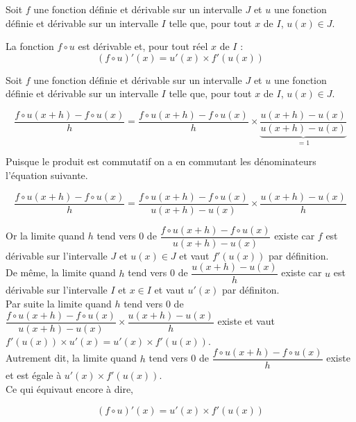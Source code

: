 \documentclass[french]{book}
\begin{document}
\begin{prop}
% 
% 
% 
Soit $f$ une fonction définie et dérivable sur un intervalle $J$ et $u$ une fonction définie et dérivable sur un intervalle $I$ telle que, pour tout $x$ de $I$, $u(x)\in J$.

La fonction $f \circ u$ est dérivable et, pour tout réel $x$ de $I$ : \[(f\circ u)'(x)=u'(x)\times f'(u(x))\]
\end{prop}


\begin{demo}
Soit $f$ une fonction définie et dérivable sur un intervalle $J$ et $u$ une fonction définie et dérivable sur un intervalle $I$ telle que, pour tout $x$ de $I$, $u(x)\in J$.

$$\dfrac{f\circ u (x+h) - f\circ u (x)}{h} = \dfrac{f\circ u (x+h) - f\circ u (x)}{h} \times \underbrace{\dfrac{u(x+h)-u(x)}{u(x+h)-u(x)}}_{=1} $$
 
 Puisque le produit est commutatif on a en commutant les dénominateurs l'équation suivante. 
 
$$\dfrac{f\circ u (x+h) - f\circ u (x)}{h} = \dfrac{f\circ u (x+h) - f\circ u (x)}{u(x+h)-u(x)} \times \dfrac{u(x+h)-u(x)}{h} $$

Or la limite quand $h$ tend vers 0 de  $\dfrac{f\circ u (x+h) - f\circ u (x)}{u(x+h)-u(x)}$ existe car $f$ est dérivable sur l'intervalle $J$ et  $u(x)\in J$ et vaut $f'(u(x))$ par définition.\\

De même, la limite quand $h$ tend vers 0 de  $\dfrac{u(x+h)-u(x)}{h}$ existe car $u$ est dérivable sur l'intervalle $I$ et $x\in I$ et vaut $u'(x)$ par définiton.\\

Par suite la limite quand $h$ tend vers 0 de  $\dfrac{f\circ u (x+h) - f\circ u (x)}{u(x+h)-u(x)} \times \dfrac{u(x+h)-u(x)}{h}$ existe et vaut $f'(u(x)) \times u'(x) = u'(x)\times f'(u(x))$. \\ 

Autrement dit, la limite quand $h$ tend vers 0 de  $\dfrac{f\circ u (x+h) - f\circ u (x)}{h}$ existe et est égale à $u'(x)\times f'(u(x))$. \\

Ce qui équivaut encore à dire,

 $$ (f\circ u)'(x)=u'(x)\times f'(u(x))$$


\end{demo}
\end{document}
